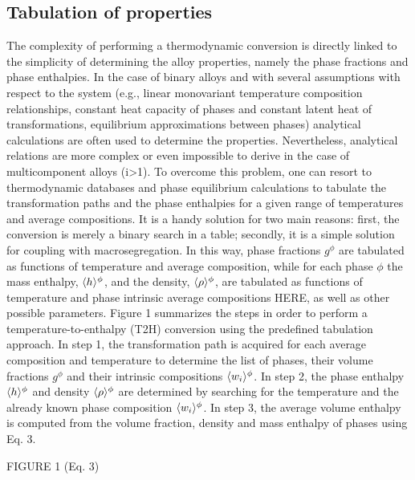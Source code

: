 \subsection{Tabulation of properties}
The complexity of performing a thermodynamic conversion is directly linked to the simplicity of determining the alloy properties, namely the 
phase fractions and phase enthalpies. In the case of binary alloys and with several assumptions with respect to the system (e.g., linear monovariant 
temperature composition relationships, constant heat capacity of phases and constant latent heat of transformations, equilibrium approximations between 
phases) analytical calculations are often used to determine the properties. Nevertheless, analytical relations are more complex or even impossible to 
derive in the case of multicomponent alloys (i>1). To overcome this problem, one can resort to thermodynamic databases and phase equilibrium calculations 
to tabulate the transformation paths and the phase enthalpies for a given range of temperatures and average compositions. It is a handy solution for two 
main reasons: first, the conversion is merely a binary search in a table; secondly, it is a simple solution for coupling with macrosegregation. In this way, 
phase fractions $g^\phi$ are tabulated as functions of temperature and average composition, while for each phase $\phi$ the mass enthalpy, $\langle h \rangle^{\phi}$, and 
the density, $\langle \rho \rangle^{\phi}$, are tabulated as functions of temperature and phase intrinsic average compositions HERE, as well as other possible parameters. 
Figure 1 summarizes the steps in order to perform a temperature-to-enthalpy (T2H) conversion using the predefined tabulation approach. In step 1, the 
transformation path is acquired for each average composition and temperature to determine the list of phases, their volume fractions $g^\phi$ and their intrinsic 
compositions $\langle w_i \rangle^{\phi}$. In step 2, the phase enthalpy $\langle h \rangle^{\phi}$  and density $\langle \rho \rangle^{\phi}$ are determined by searching for the temperature 
and the already known phase composition $\langle w_i \rangle^\phi$. In step 3, the average volume enthalpy is computed from the volume fraction, density and mass enthalpy 
of phases using Eq. 3.

FIGURE 1 (Eq. 3)

